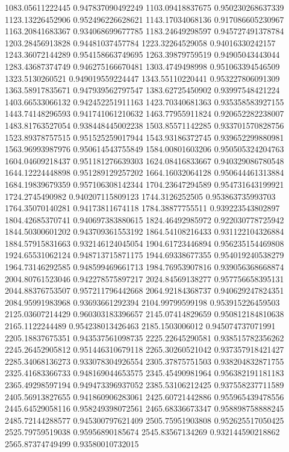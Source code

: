 {1083.05611222445 0.947837090492249
1103.09418837675 0.950230268637339
1123.13226452906 0.952496226628621
1143.17034068136 0.917086605230967
1163.20841683367 0.934068699677785
1183.24649298597 0.945727491378784
1203.28456913828 0.94481037457784
1223.32264529058 0.94016330242157
1243.36072144289 0.954158663749695
1263.39879759519 0.94905043443044
1283.43687374749 0.946275166670481
1303.4749498998 0.951063394546509
1323.5130260521 0.949019559224447
1343.55110220441 0.953227806091309
1363.58917835671 0.947939562797547
1383.62725450902 0.93997548421224
1403.66533066132 0.942452251911163
1423.70340681363 0.935358583927155
1443.74148296593 0.941741061210632
1463.77955911824 0.920652282238007
1483.81763527054 0.938448445002238
1503.85571142285 0.933701570828756
1523.89378757515 0.951525259017944
1543.93186372745 0.939652299880981
1563.96993987976 0.950614543755849
1584.00801603206 0.950505324204763
1604.04609218437 0.951181276639303
1624.08416833667 0.940329086780548
1644.12224448898 0.951289129257202
1664.16032064128 0.950644461313884
1684.19839679359 0.957106308142344
1704.23647294589 0.954731643199921
1724.2745490982 0.940207115809123
1744.3126252505 0.953863735993703
1764.35070140281 0.94173811674118
1784.38877755511 0.939223543802897
1804.42685370741 0.940697383880615
1824.46492985972 0.922030778725942
1844.50300601202 0.943709361553192
1864.54108216433 0.931122104326884
1884.57915831663 0.932146124045054
1904.61723446894 0.956235154469808
1924.65531062124 0.948713715871175
1944.69338677355 0.954019240538279
1964.73146292585 0.948599469661713
1984.76953907816 0.939056368668874
2004.80761523046 0.942278575897217
2024.84569138277 0.957756658395131
2044.88376753507 0.957211796442668
2064.92184368737 0.940629247824351
2084.95991983968 0.93693661292394
2104.99799599198 0.953915226459503
2125.03607214429 0.960303183396657
2145.07414829659 0.950812184810638
2165.1122244489 0.954238013426463
2185.1503006012 0.945074737071991
2205.18837675351 0.943537561098735
2225.22645290581 0.938515782356262
2245.26452905812 0.951446310679118
2265.30260521042 0.937357918421427
2285.34068136273 0.933078304926554
2305.37875751503 0.938204832871755
2325.41683366733 0.948169044653575
2345.45490981964 0.956382191181183
2365.49298597194 0.949473396937052
2385.53106212425 0.937558237711589
2405.56913827655 0.941860906283061
2425.60721442886 0.955965439478556
2445.64529058116 0.958249398072561
2465.68336673347 0.958898758888245
2485.72144288577 0.945300797621409
2505.75951903808 0.952625517050425
2525.79759519038 0.95956890185674
2545.83567134269 0.932144590218862
2565.87374749499 0.93580010732015
}
